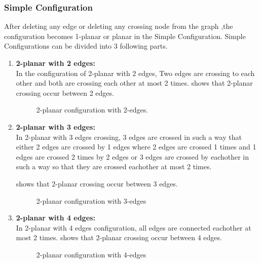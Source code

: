 \subsubsection{Simple Configuration}

After deleting any edge or deleting any crossing node from the graph ,the configuration becomes 1-planar or planar in the Simple Configuration. Simple Configurations can be divided into 3 following parts.

\begin{enumerate}

\item {\textbf{2-planar with 2 edges:\\}}
In the configuration of 2-planar with 2 edges, Two edges are crossing to each other and both are crossing each other at most 2 times.
 shows that 2-planar crossing occur between 2 edges.



\begin{figure}[!tb]
\centering
\resizebox{150mm}{!}{}
\caption{2-planar configuration with 2-edges.}
\label{fig:2planarwith2edges}
\end{figure}


\item {\textbf{2-planar with 3 edges:\\}}
In 2-planar with 3 edges crossing, 3 edges are crossed in such a way that either 2 edges are crossed by 1 edges where 2 edges are crossed 1 times and 1 edges are crossed 2 times by 2 edges or 3 edges are crossed by eachother in such a way so that they are crossed eachother at most 2 times.

 shows that 2-planar crossing occur between 3 edges.

\begin{figure}[!tb]
\centering
\resizebox{100mm}{!}{}
\caption{2-planar configuration with 3-edges}
\label{fig:2planarwith3edges}
\end{figure}


\item {\textbf{2-planar with 4 edges:\\}}
In 2-planar with 4 edges configuration, all edges are connected eachother at most 2 times.
 shows that 2-planar crossing occur between 4 edges.
\begin{figure}[!tb]
\centering
\resizebox{60mm}{!}{}
\caption{2-planar configuration with 4-edges}
\label{fig:2planarwith4edges}
\end{figure}
\end{enumerate}

